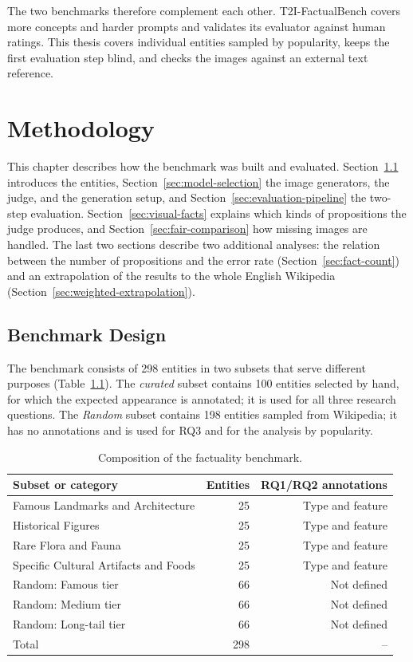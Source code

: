 The two benchmarks therefore complement each other. T2I-FactualBench covers
more concepts and harder prompts and validates its evaluator against human
ratings. This thesis covers individual entities sampled by popularity, keeps
the first evaluation step blind, and checks the images against an external text
reference.


\chapter{Methodology}
\label{chap:methodology}

This chapter describes how the benchmark was built and evaluated.
Section~\ref{sec:benchmark-design} introduces the entities,
Section~\ref{sec:model-selection} the image generators, the judge, and the
generation setup, and Section~\ref{sec:evaluation-pipeline} the two-step
evaluation. Section~\ref{sec:visual-facts} explains which kinds of
propositions the judge produces, and Section~\ref{sec:fair-comparison} how
missing images are handled. The last two sections describe two additional
analyses: the relation between the number of propositions and the error rate
(Section~\ref{sec:fact-count}) and an extrapolation of the results to the whole
English Wikipedia (Section~\ref{sec:weighted-extrapolation}).

\section{Benchmark Design}
\label{sec:benchmark-design}

The benchmark consists of 298 entities in two subsets that serve different
purposes (Table~\ref{tab:benchmark-composition}). The \emph{curated} subset
contains 100 entities selected by hand, for which the expected appearance is
annotated; it is used for all three research questions. The \emph{Random}
subset contains 198 entities sampled from Wikipedia; it has no annotations and
is used for RQ3 and for the analysis by popularity.

\begin{table}[ht]
\centering
\caption{Composition of the factuality benchmark.}
\label{tab:benchmark-composition}
\begin{tabular}{lrr}
\toprule
Subset or category & Entities & RQ1/RQ2 annotations \\
\midrule
Famous Landmarks and Architecture & 25 & Type and feature \\
Historical Figures & 25 & Type and feature \\
Rare Flora and Fauna & 25 & Type and feature \\
Specific Cultural Artifacts and Foods & 25 & Type and feature \\
Random: Famous tier & 66 & Not defined \\
Random: Medium tier & 66 & Not defined \\
Random: Long-tail tier & 66 & Not defined \\
\midrule
Total & 298 & -- \\
\bottomrule
\end{tabular}
\end{table}

